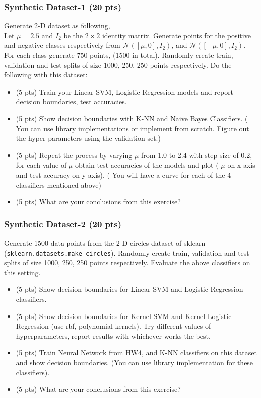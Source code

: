 \documentclass[a4paper]{article}
\theoremstyle{definition}
\begin{document}
 \subsubsection{Synthetic Dataset-1 (20 pts)}
 Generate 2-D dataset as following, \\
 Let $\mu=2.5$ and $I_2$ be the $2\times2$ identity matrix. Generate points for the positive and negative classes respectively from $\mathcal{N}([\mu,0],I_2)$, and $\mathcal{N}([-\mu,0],I_2)$. For each class generate 750 points, (1500 in total). Randomly create train, validation and test splits of size 1000, 250, 250 points respectively. Do the following with this dataset:
 \begin{itemize}
     \item (5 pts) Train your Linear SVM, Logistic Regression models and report decision boundaries, test accuracies. 
     \item (5 pts) Show decision boundaries with K-NN and Naive Bayes Classifiers. ( You can use library implementations or implement from scratch. Figure out the hyper-parameters using the validation set.) 
     \item (5 pts) Repeat the process by varying $\mu$ from 1.0 to 2.4 with step size of 0.2, for each value of $\mu$ obtain test accuracies of the models and plot ( $\mu$ on x-axis and test accuracy on y-axis). ( You will have a curve for each of the 4-classifiers mentioned above)
     \item (5 pts) What are your conclusions from this exercise?
 \end{itemize}
 
 \subsubsection{Synthetic Dataset-2  (20 pts) }
 Generate 1500 data points from the 2-D circles dataset of sklearn (\texttt{sklearn.datasets.make\_circles}). Randomly create train, validation and test splits of size 1000, 250, 250 points respectively. Evaluate the above classifiers on this setting.
 \begin{itemize}
     \item (5 pts) Show decision boundaries for Linear SVM and Logistic Regression classifiers. 
     \item (5 pts) Show decision boundaries for Kernel SVM and Kernel Logistic Regression (use rbf, polynomial kernels). Try different values of hyperparameters, report results with whichever works the best.
     \item (5 pts) Train Neural Network from HW4, and K-NN classifiers on this dataset and show decision boundaries. (You can use library implementation for these classifiers).
     \item (5 pts) What are your conclusions from this exercise?
 \end{itemize}
 
\end{document}

